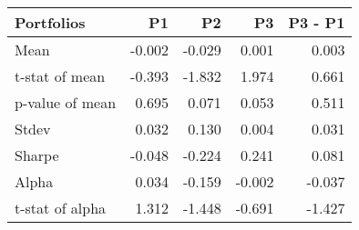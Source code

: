 \begin{tabular}{lrrrr}
\toprule
Portfolios & P1 & P2 & P3 & P3 - P1 \\
\midrule
Mean & -0.002 & -0.029 & 0.001 & 0.003 \\
t-stat of mean & -0.393 & -1.832 & 1.974 & 0.661 \\
p-value of mean & 0.695 & 0.071 & 0.053 & 0.511 \\
Stdev & 0.032 & 0.130 & 0.004 & 0.031 \\
Sharpe & -0.048 & -0.224 & 0.241 & 0.081 \\
Alpha & 0.034 & -0.159 & -0.002 & -0.037 \\
t-stat of alpha & 1.312 & -1.448 & -0.691 & -1.427 \\
\bottomrule
\end{tabular}

